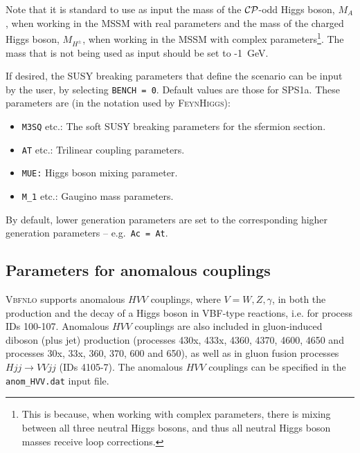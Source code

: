 \documentclass[english,12pt]{article}
\begin{document}
 Note that it is standard to use as input the mass of the $\cal{CP}$-odd Higgs boson,
$M_{A}$, when working in the MSSM with real parameters and the mass of the
charged Higgs boson, $M_{H^{\pm}}$, when working in the MSSM with complex
parameters\footnote{This is because, when working with complex parameters, there
is mixing between all three neutral Higgs bosons, and thus all neutral Higgs boson
masses receive loop corrections.}.  The mass that is not being used as input should
be set to -1~GeV.

If desired, the SUSY breaking parameters that define the scenario can be input
by the user, by selecting {\tt BENCH = 0}.  Default values are those for SPS1a. 
These parameters are (in the notation used by \textsc{FeynHiggs}):
\begin{itemize}
 \item {\tt M3SQ} etc.: The soft SUSY breaking parameters for the sfermion section.
 \item {\tt AT} etc.: Trilinear coupling parameters.
 \item {\tt MUE:} Higgs boson mixing parameter.
 \item {\tt M\_1} etc.: Gaugino mass parameters.
\end{itemize}
By default, lower generation parameters are set to the corresponding higher generation parameters -- e.g.\ {\tt Ac = At}.


\subsection{Parameters for anomalous couplings}

\textsc{Vbfnlo} supports anomalous $HVV$ couplings, where $V=W,Z,\gamma$, in
both the production and the decay of a Higgs boson in VBF-type reactions,  i.e.
for process IDs 100-107. Anomalous $HVV$ couplings are also included in gluon-induced diboson (plus jet) production (processes 430x, 433x, 4360, 4370, 4600, 4650 and processes 30x,
33x, 360, 370, 600 and 650), as well as in gluon fusion processes $Hjj \rightarrow VVjj$
(IDs 4105-7). The anomalous $HVV$ couplings can be specified in the {\tt
anom\_HVV.dat} input file.
\end{document}
